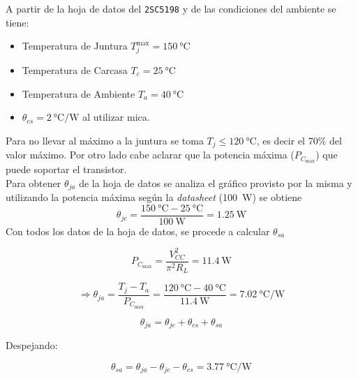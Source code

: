 	A partir de la hoja de datos del \texttt{2SC5198} y de las condiciones del ambiente se tiene:
	\begin{itemize}
		\item  Temperatura de Juntura $T^{\max}_j = \SI{150}{\celsius} $
		\item  Temperatura de Carcasa $T_c = \SI{25}{\celsius} $
		\item  Temperatura de Ambiente $T_a = \SI{40}{\celsius} $
		\item  $\theta_{cs} = \SI{2}{\celsius\per\W}$ al utilizar mica.
	\end{itemize}

		Para no llevar al máximo a la juntura se toma $T_j \leq \SI{120}{\celsius}$, es decir el 70\% del valor máximo. Por otro lado cabe aclarar que la potencia máxima ($P_{C_{\max}}$) que puede soportar el transistor.\\
		\indent Para obtener $\theta_{ja}$ de la hoja de datos se analiza el gráfico provisto por la misma y utilizando la potencia máxima según la \emph{datasheet} (\SI{100}{\W}) se obtiene
			\begin{equation*}
				\theta_{jc} = \frac{\SI{150}{\celsius} - \SI{25}{\celsius}}{\SI{100}{\W}} = \SI{1.25}{\W}
			\end{equation*}
		\indent Con todos los datos de la hoja de datos, se procede a calcular $\theta_{sa}$

	\begin{equation*}
		P_{C_{\max}} = \frac{V^2_{CC}}{\pi^2 R_L} = \SI{11.4}{\W}
	\end{equation*}

	\begin{equation*}
		\Rightarrow \theta_{ja} =  \frac{T_j - T_a}{P_{C_{\max}}} = \frac{\SI{120}{\celsius} - \SI{40}{\celsius}}{\SI{11.4}{\W}}=\SI{7.02}{\celsius\per\W}
	\end{equation*}
	

	\begin{equation*}
		\theta_{ja} = \theta_{jc} + \theta_{cs} + \theta_{sa}
	\end{equation*}

	Despejando:

	\begin{equation*}
		\theta_{sa} = \theta_{ja} - \theta_{jc} - \theta_{cs} = \boxed{\SI{3.77}{\celsius\per\W}}
	\end{equation*}

